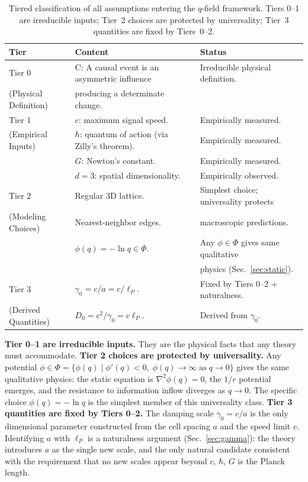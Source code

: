 \documentclass[aps,prd,twocolumn,showpacs,superscriptaddress,preprintnumbers]{revtex4-2}
\begin{document}
\begin{table}[h]
\centering
\caption{Tiered classification of all assumptions entering the $q$-field framework. Tiers 0--1 are irreducible inputs; Tier~2 choices are protected by universality; Tier~3 quantities are fixed by Tiers~0--2.}
\label{tab:tiers}
\begin{tabular}{p{}p{}p{}}
\toprule
\textbf{Tier} & \textbf{Content} & \textbf{Status} \\
\midrule
Tier 0 & C: A causal event is an asymmetric influence & Irreducible physical definition. \\
(Physical Definition) & producing a determinate change. & \\
\midrule
Tier 1 & $c$: maximum signal speed. & Empirically measured. \\
(Empirical Inputs) & $\hbar$: quantum of action (via Zilly's theorem). & Empirically measured. \\
& $G$: Newton's constant. & Empirically measured. \\
& $d=3$: spatial dimensionality. & Empirically observed. \\
\midrule
Tier 2 & Regular 3D lattice. & Simplest choice; universality protects \\
(Modeling Choices) & Nearest-neighbor edges. & macroscopic predictions. \\
& $\phi(q)=-\ln q \in \Phi$. & Any $\phi\in\Phi$ gives same qualitative \\
& & physics (Sec.~\ref{sec:static}). \\
\midrule
Tier 3 & $\gamma_0 = c/a = c/\ell_P$. & Fixed by Tiers 0--2 + naturalness. \\
(Derived Quantities) & $D_0 = c^2/\gamma_0 = c\ell_P$. & Derived from $\gamma_0$. \\
\bottomrule
\end{tabular}
\end{table}

\textbf{Tier 0--1 are irreducible inputs.} They are the physical facts that any theory must accommodate.
\textbf{Tier 2 choices are protected by universality.} Any potential $\phi\in\Phi=\{\phi(q)\mid\phi'(q)<0,\;\phi(q)\to\infty\;\text{as}\;q\to0\}$ gives the same qualitative physics: the static equation is $\nabla^2\phi(q)=0$, the $1/r$ potential emerges, and the resistance to information inflow diverges as $q\to0$.
The specific choice $\phi(q)=-\ln q$ is the simplest member of this universality class.
\textbf{Tier 3 quantities are fixed by Tiers 0--2.} The damping scale $\gamma_0=c/a$ is the only dimensional parameter constructed from the cell spacing $a$ and the speed limit $c$.
Identifying $a$ with $\ell_P$ is a naturalness argument (Sec.~\ref{sec:gamma}): the theory introduces $a$ as the single new scale, and the only natural candidate consistent with the requirement that no new scales appear beyond $c$, $\hbar$, $G$ is the Planck length.
\end{document}
